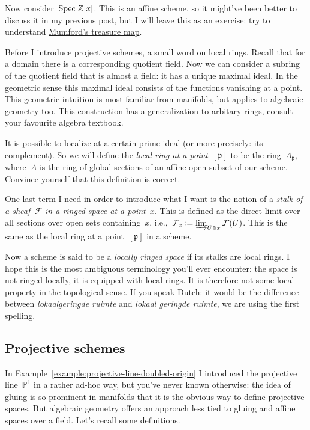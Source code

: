 \begin{example}
  Now consider~$\operatorname{Spec\,}\mathbb{Z}[x]$. This is an affine scheme, so it might've been better to discuss it in my previous post, but I will leave this as an exercise: try to understand \href{http://www.neverendingbooks.org/index.php/mumfords-treasure-map.html}{Mumford's treasure map}.
\end{example}

Before I introduce projective schemes, a small word on local rings. Recall that for a domain there is a corresponding quotient field. Now we can consider a subring of the quotient field that is almost a field: it has a unique maximal ideal. In the geometric sense this maximal ideal consists of the functions vanishing at a point. This geometric intuition is most familiar from manifolds, but applies to algebraic geometry too. This construction has a generalization to arbitary rings, consult your favourite algebra textbook.

It is possible to localize at a certain prime ideal (or more precisely: its complement). So we will define the \emph{local ring at a point~$[\mathfrak{p}]$} to be the ring~$A_{\mathfrak{p}}$, where~$A$ is the ring of global sections of an affine open subset of our scheme. Convince yourself that this definition is correct.

One last term I need in order to introduce what I want is the notion of a \emph{stalk of a sheaf~$\mathcal{F}$ in a ringed space at a point~$x$}. This is defined as the direct limit over all sections over open sets containing~$x$, i.e.,~$\mathcal{F}_x\coloneqq\varinjlim_{U\ni x}\mathcal{F}(U)$. This is the same as the local ring at a point~$[\mathfrak{p}]$ in a scheme.

Now a scheme is said to be a \emph{locally ringed space} if its stalks are local rings. I hope this is the most ambiguous terminology you'll ever encounter: the space is not ringed locally, it is equipped with local rings. It is therefore not some local property in the topological sense. If you speak Dutch: it would be the difference between \emph{lokaalgeringde ruimte} and \emph{lokaal geringde ruimte}, we are using the first spelling.


\subsection{Projective schemes}

In Example~\ref{example:projective-line-doubled-origin} I introduced the projective line~$\mathbb{P}^1$ in a rather ad-hoc way, but you've never known otherwise: the idea of gluing is so prominent in manifolds that it is the obvious way to define projective spaces. But algebraic geometry offers an approach less tied to gluing and affine spaces over a field. Let's recall some definitions.

